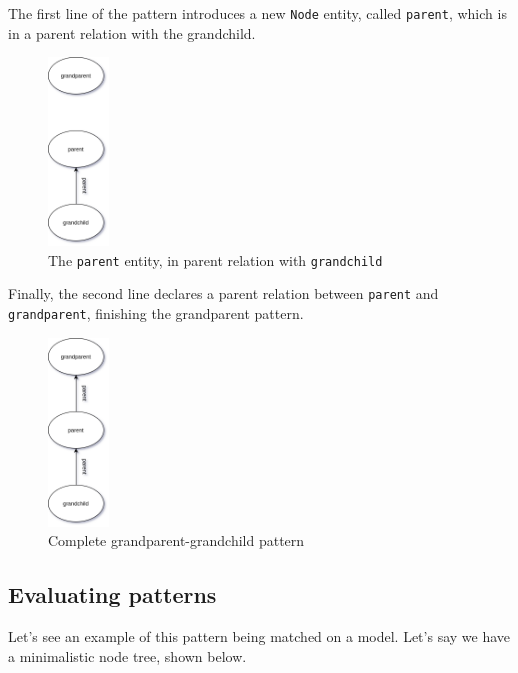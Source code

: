 \documentclass[11pt,a4paper,oneside]{report}
\begin{document}
The first line of the pattern introduces a new \texttt{Node} entity, called
\texttt{parent}, which is in a parent relation with the grandchild.

\begin{figure}[!htbp]
\centering
\includegraphics[height=50mm, keepaspectratio]{figures/basic-pattern-explanation-2.png}
\caption{The \texttt{parent} entity, in parent relation with \texttt{grandchild}}
\label{fig:basic-pattern-explanation-2}
\end{figure}

Finally, the second line declares a parent relation between \texttt{parent} and
\texttt{grandparent}, finishing the grandparent pattern.

\pagebreak
\begin{figure}[!htbp]
\centering
\includegraphics[height=50mm, keepaspectratio]{figures/basic-pattern-explanation-3.png}
\caption{Complete grandparent-grandchild pattern}
\label{fig:basic-pattern-explanation-3}
\end{figure}

\subsection{Evaluating patterns}
Let's see an example of this pattern being matched on a model. Let's say we have
a minimalistic node tree, shown below.
\end{document}
